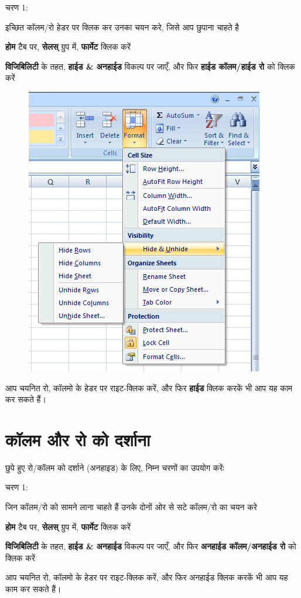 \begin{descriptionSimple}{चरण 1:}
\item[चरण 1] इच्छित कॉलम/रो हेडर पर क्लिक कर उनका चयन करे, जिसे आप छुपाना चाहते है
\item[चरण 2] \textbf{होम} टैब पर, \textbf{सेलस्} ग्रुप में, \textbf{फार्मेट} क्लिक करें
\item[चरण 3] \textbf{विजिबिलिटी} के तहत, \textbf{हाईड \& अनहाईड} विकल्प पर जाएँ, और फिर \textbf{हाईड कॉलम/हाईड रो} को क्लिक करें
\end{descriptionSimple}
\smallskip

\begin{figure}[H]
\centering
\includegraphics[scale=0.5]{src/images/chapter1/chapter1_fig39.png}
\end{figure}				

आप चयनित रो, कॉलमो के हेडर पर राइट-क्लिक करें, और फिर \textbf{हाईड} क्लिक करकें भी आप यह काम कर सकते हैं।

\section{कॉलम और रो को दर्शाना}\label{id-1.20}
छुपे हुए रो/कॉलम को दर्शाने (अनहाइड) के लिए, निम्न चरणों का उपयोग करेंः
\begin{descriptionSimple}{चरण 1:}
\item[चरण 1] जिन कॉलम/रो को सामने लाना चाहते हैं उनके दोनों ओर से सटे कॉलम/रो का चयन करे
\item[चरण 2] \textbf{होम} टैब पर, \textbf{सेलस्} ग्रुप में, \textbf{फार्मेट} क्लिक करें
\item[चरण 3] \textbf{विजिबिलिटी} के तहत, \textbf{हाईड \& अनहाईड} विकल्प पर जाएँ, और फिर \textbf{अनहाईड कॉलम/अनहाईड रो} को क्लिक करें
\end{descriptionSimple}
आप चयनित रो, कॉलमो के हेडर पर राइट-क्लिक करें, और फिर अनहाईड क्लिक करकें भी आप यह काम कर सकते हैं।

